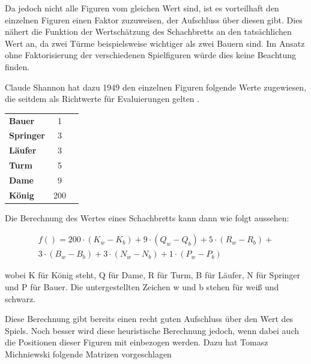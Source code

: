 Da jedoch nicht alle Figuren vom gleichen Wert sind, ist es vorteilhaft den einzelnen Figuren einen Faktor zuzuweisen, der Aufschluss über diesen gibt. Dies nähert die Funktion der Wertschätzung des Schachbretts an den tatsächlichen Wert an, da zwei Türme beispielsweise wichtiger als zwei Bauern sind. Im Ansatz ohne Faktorisierung der verschiedenen Spielfiguren würde dies keine Beachtung finden.

Claude Shannon hat dazu 1949 den einzelnen Figuren folgende Werte zugewiesen, die seitdem als Richtwerte für Evaluierungen gelten \cite{Shannon1950}.

\begin{center}
\begin{tabular}{ l c r }
\textbf{Bauer} & 1\\
\textbf{Springer} & 3 \\
\textbf{Läufer} & 3 \\
\textbf{Turm} & 5 \\
\textbf{Dame} & 9 \\
\textbf{König} & 200
\end{tabular}
\end{center}

Die Berechnung des Wertes eines Schachbretts kann dann wie folgt aussehen:

\begin{equation}
\begin{aligned}
f() = 200 \cdot (K_w-K_b) + 9 \cdot (Q_w-Q_b) + 5 \cdot (R_w-R_b) + \\3 \cdot (B_w-B_b) + 3 \cdot (N_w-N_b) + 1 \cdot (P_w-P_b)
\end{aligned}
\end{equation}


wobei K für König steht, Q für Dame, R für Turm, B für Läufer, N für Springer und P für Bauer. Die untergestellten Zeichen w und b stehen für weiß und schwarz.

Diese Berechnung gibt bereits einen recht guten Aufschluss über den Wert des Spiels. Noch besser wird diese heuristische Berechnung jedoch, wenn dabei auch die Positionen dieser Figuren mit einbezogen werden. Dazu hat Tomasz Michniewski folgende Matrizen vorgeschlagen \cite{O.V.2019a}

